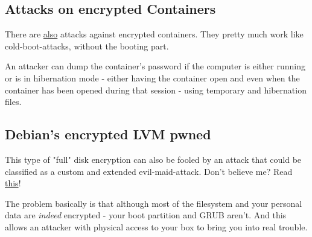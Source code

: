 \documentclass{article}
\begin{document}
\subsection{Attacks on encrypted Containers}


 There are \href{https://www.infoworld.com/d/security/bitlocker-pgp-and-truecrypt-encryption-weakened-new-attack-tool-209996}{also} attacks against encrypted containers. They pretty much work like cold-boot-attacks, without the booting part.

An attacker can dump the container's password if the computer is either running or is in hibernation mode - either having the container open and even when the container has been opened during that session - using temporary and hibernation files. 
\subsection{Debian's encrypted LVM pwned}


 This type of "full" disk encryption can also be fooled by an attack that could be classified as a custom and extended evil-maid-attack. Don't believe me? Read \href{https://twopointfouristan.wordpress.com/2011/04/17/pwning-past-whole-disk-encryption/}{this}!


 The problem basically is that although most of the filesystem and your personal data are \emph{indeed} encrypted - your boot partition and GRUB aren't. And this allows an attacker with physical access to your box to bring you into real trouble. 
\end{document}
